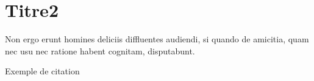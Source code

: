 \section{Titre2}

Non ergo erunt homines deliciis diffluentes audiendi, si quando de amicitia, quam nec usu nec ratione habent cognitam, disputabunt.

Exemple de citation \cite{sheffer2006mpm}
